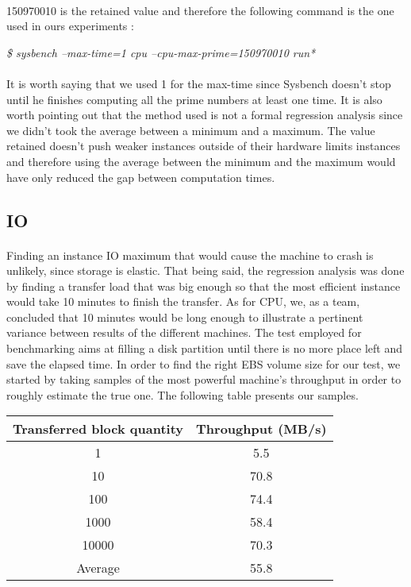 \documentclass[11pt]{article}
\begin{document}
		\paragraph{} 150970010 is the retained value and therefore the following
		command is the one used in ours experiments : \bigskip

		\indent \emph{\$ sysbench --max-time=1 cpu --cpu-max-prime=150970010 run*}

		\paragraph{} It is worth saying that we used 1 for the max-time since Sysbench doesn’t stop
		until he finishes computing all the prime numbers at least one time. It is also
		worth pointing out that the method used is not a formal regression analysis
		since we didn't took the average between a minimum and a maximum. The value
		retained doesn’t push weaker instances outside of their hardware limits
		instances and therefore using the average between the minimum and the maximum
		would have only reduced the gap between computation times. 
	\subsection{IO}
		\paragraph{} Finding an instance IO maximum that would cause the machine
		to crash is unlikely, since storage is elastic. That being said, the
		regression analysis was done by finding a transfer load that was big
		enough so that the most efficient instance would take 10 minutes to
		finish the transfer. As for CPU, we, as a team, concluded that 10
		minutes would be long enough to illustrate a pertinent variance between
		results of the different machines. The test employed for benchmarking
		aims at filling a disk partition until there is no more place left and
		save the elapsed time. In order to find the right EBS volume size for
		our test, we started by taking samples of the most powerful machine’s
		throughput in order to roughly estimate the true one. The following
		table presents our samples. \bigskip

		{\centering
			 \label{tab:io_regression_analysis}
			\begin{tabular}{c|c}
				Transferred block quantity & Throughput (MB/s) \\
				\hline
				1 & 5.5 \\
				10 & 70.8 \\
				100 & 74.4 \\
				1000 & 58.4 \\
				10000 & 70.3 \\
				\hline
				Average & 55.8 \\
			\end{tabular}
		\par }
		
\end{document}
